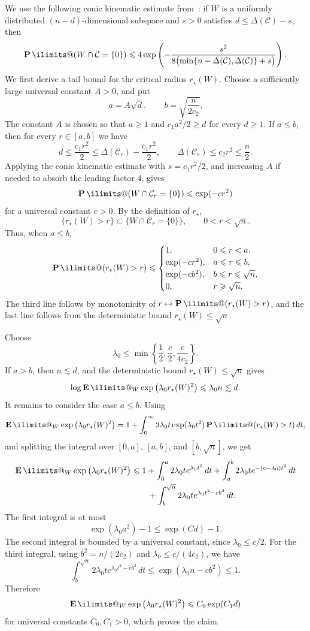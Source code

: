 \documentclass[11pt, letterpaper, hidelinks]{article}
\makeatletter
\renewcommand{\proofname}{\textit{\textbf{Proof}}}
\renewenvironment{proof}[1][\proofname]{\par\pushQED{\qed}\normalfont \topsep6\p@\@plus6\p@\relax\trivlist\item[\hskip\labelsep#1\@addpunct{}]\ignorespaces}{\popQED\endtrivlist\@endpefalse}
\newcommand{\1}{\mathbf 1}
\let\subseteq\subset
\renewcommand{\le}{\leqslant}
\renewcommand{\ge}{\geqslant}
\renewcommand{\leq}{\leqslant}
\renewcommand{\geq}{\geqslant}
\newcommand{\E}{\operatorname*{\mathbf{E}}\ilimits@}
\renewcommand{\P}{\operatorname*{\mathbf{P}}\ilimits@}
\theoremstyle{plain}
\theoremstyle{definition}
\makeatother
\begin{document}
\begin{proof}[Proof of~\Cref{lem:critical-radius-mgf-bound}]
We use the following conic kinematic estimate
from~\cite[Theorem~7.1 and Eq.~(6.1)]{amelunxen2014living}: if \(W\) is a uniformly distributed
\((n-d)\)-dimensional subspace and \(s>0\) satisfies
\(d\leq \Delta(\mathcal C)-s\), then
\[
\P(W\cap \mathcal C=\{0\})
\leq
4\exp\left(
-\frac{s^2}{
8\bigl(\min\{n-\Delta(\mathcal C),\Delta(\mathcal C)\}+s\bigr)}
\right).
\]
We first derive a tail bound for the critical radius \(r_\star(W)\). Choose a sufficiently large
universal constant \(A>0\), and put
\[
a=A\sqrt d,
\qquad
b=\sqrt{\frac{n}{2c_2}}.
\]
The constant \(A\) is chosen so that \(a\ge 1\) and
\(c_1a^2/2\ge d\) for every \(d\ge1\). If \(a\le b\), then for every
\(r\in[a,b]\) we have
\[
d\leq \frac{c_1r^2}{2}
\leq
\Delta(\mathcal C_r)-\frac{c_1r^2}{2},
\qquad
\Delta(\mathcal C_r)\le c_2r^2\le \frac n2.
\]
Applying the conic kinematic estimate with \(s=c_1r^2/2\), and increasing
$A$ if needed to absorb the leading factor $4$, gives
\[
\P(W\cap \mathcal C_r=\{0\})
\leq
\exp(-c r^2)
\]
for a universal constant \(c>0\). By the definition of \(r_\star\),
\[
\{r_\star(W)>r\}
\subseteq
\{W\cap\mathcal C_r=\{0\}\},
\qquad 0<r<\sqrt n.
\]
Thus, when \(a\le b\),
\[
\P(r_\star(W)>r)
\leq
\begin{cases}
1, & 0\leq r<a,\\
\exp(-c r^2), & a\leq r\leq b,\\
\exp(-c b^2), & b\leq r\leq \sqrt n,\\
0, & r\geq \sqrt n.
\end{cases}
\]
The third line follows by monotonicity of \(r\mapsto\P(r_\star(W)>r)\), and
the last line follows from the deterministic bound \(r_\star(W)\le\sqrt n\).

Choose
\[
\lambda_0
\leq
\min\left\{\frac12,\frac c2,\frac{c}{4c_2}\right\}.
\]
If \(a>b\), then \(n\lesssim d\), and the deterministic bound
\(r_\star(W)\le \sqrt n\) gives
\[
\log \E_W \exp\left(\lambda_0 r_\star(W)^2\right)
\leq
\lambda_0 n
\lesssim d.
\]
It remains to consider the case \(a\le b\). Using
\[
\E_W \exp\left(\lambda_0 r_\star(W)^2\right)
=
1+
\int_0^\infty
2\lambda_0 t\exp(\lambda_0 t^2)
\P(r_\star(W)>t)\,dt,
\]
and splitting the integral over \([0,a]\), \([a,b]\), and
\([b,\sqrt n]\), we get
\begin{align}
\E_W \exp\left(\lambda_0 r_\star(W)^2\right)
&\leq
1+
\int_0^a
2\lambda_0 t e^{\lambda_0 t^2}\,dt
+
\int_a^b
2\lambda_0 t e^{-(c-\lambda_0)t^2}\,dt  \\
&\qquad
+
\int_b^{\sqrt n}
2\lambda_0 t e^{\lambda_0 t^2-cb^2}\,dt .
\end{align}
The first integral is at most
\[
\exp(\lambda_0 a^2)-1
\leq
\exp(Cd)-1.
\]
The second integral is bounded by a universal constant, since
\(\lambda_0\le c/2\). For the third integral, using
\(b^2=n/(2c_2)\) and \(\lambda_0\le c/(4c_2)\), we have
\[
\int_b^{\sqrt n}
2\lambda_0 t e^{\lambda_0 t^2-cb^2}\,dt
\leq
\exp(\lambda_0 n-cb^2)
\leq 1 .
\]
Therefore
\[
\E_W \exp\left(\lambda_0 r_\star(W)^2\right)
\leq
C_0\exp(C_1d)
\]
for universal constants \(C_0,C_1>0\), which proves the claim.
\end{proof}
\end{document}
